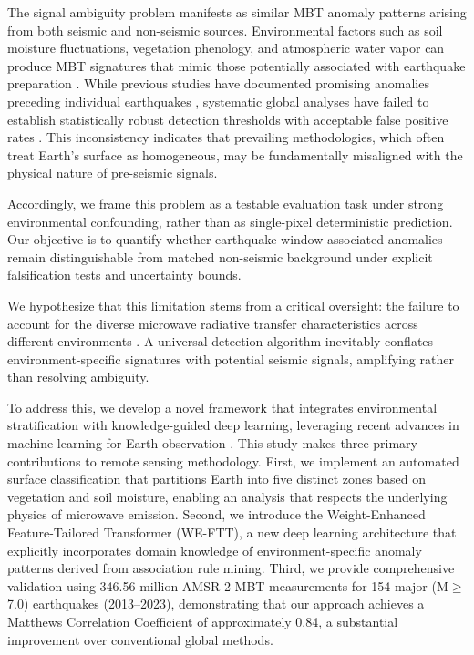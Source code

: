 \documentclass[preprint,review,12pt,authoryear]{elsarticle}
\begin{document}
The signal ambiguity problem manifests as similar MBT anomaly patterns arising from both seismic and non-seismic sources. Environmental factors such as soil moisture fluctuations, vegetation phenology, and atmospheric water vapor can produce MBT signatures that mimic those potentially associated with earthquake preparation \citep{qiCharacteristicBackgroundMicrowave2023}. While previous studies have documented promising anomalies preceding individual earthquakes \citep{akhoondzadehMultiPrecursorsAnalysis2018,qiSpatiotemporallyWeightedTwostep2020}, systematic global analyses have failed to establish statistically robust detection thresholds with acceptable false positive rates \citep{gellerEarthquakesCannotPredicted1997,cuiSatelliteThermalInfrared2019,contiSystematicReviewMetaAnalysis2021,ciceroneSystematicCompilationEarthquake2009}. This inconsistency indicates that prevailing methodologies, which often treat Earth's surface as homogeneous, may be fundamentally misaligned with the physical nature of pre-seismic signals.

Accordingly, we frame this problem as a testable evaluation task under strong environmental confounding, rather than as single-pixel deterministic prediction. Our objective is to quantify whether earthquake-window-associated anomalies remain distinguishable from matched non-seismic background under explicit falsification tests and uncertainty bounds.

We hypothesize that this limitation stems from a critical oversight: the failure to account for the diverse microwave radiative transfer characteristics across different environments \citep{njokuRetrievalLandSurface1999,guptaMicrowaveEmissionScattering2014}. A universal detection algorithm inevitably conflates environment-specific signatures with potential seismic signals, amplifying rather than resolving ambiguity. 

To address this, we develop a novel framework that integrates environmental stratification with knowledge-guided deep learning, leveraging recent advances in machine learning for Earth observation \citep{reichsteinDeepLearningEarth2019,zhuDeepLearningRemote2017}. This study makes three primary contributions to remote sensing methodology. First, we implement an automated surface classification that partitions Earth into five distinct zones based on vegetation and soil moisture, enabling an analysis that respects the underlying physics of microwave emission. Second, we introduce the Weight-Enhanced Feature-Tailored Transformer (WE-FTT), a new deep learning architecture that explicitly incorporates domain knowledge of environment-specific anomaly patterns derived from association rule mining. Third, we provide comprehensive validation using 346.56 million AMSR-2 MBT measurements for 154 major (M$\ge$7.0) earthquakes (2013--2023), demonstrating that our approach achieves a Matthews Correlation Coefficient of approximately 0.84, a substantial improvement over conventional global methods.
\end{document}
